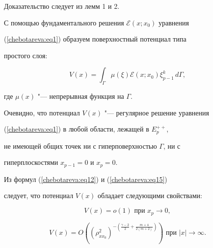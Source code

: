 Доказательство следует из лемм 1 и 2.





С помощью фундаментального решения $\mathcal{E}(x; x_0 )$ уравнения


(\ref{chebotareva:eq1}) образуем поверхностный потенциал типа


простого слоя:





\begin{equation}


\label{chebotareva:eq47} V(x) = \int_{\Gamma}


\mu\left(\xi\right)\mathcal{E}(x; x_0 )\xi _{p-1}^k \,d\Gamma,


\end{equation}


где $\mu (x)$ "--- непрерывная функция на $\Gamma$.





Очевидно,  что потенциал $V(x)$ "--- регулярное решение уравнения


(\ref{chebotareva:eq1}) в любой области,  лежащей в $E_p^{ + + } $, 


не имеющей общих точек ни с гиперповерхностью $\Gamma$,  ни с


гиперплоскостями $x_{p - 1} = 0$ и $x_p = 0$.





Из формул (\ref{chebotareva:eq12}) и (\ref{chebotareva:eq15})


следует,  что потенциал $V(x)$ обладает следующими свойствами:


\begin{equation}


\label{chebotareva:eq48} V(x) = o(1) \text{ при } x_p \to 0,


\end{equation}


\begin{equation}


\label{chebotareva:eq49} V(x) = O\left( {\left( {\rho _{xx_0 }^2 }


\right)^{ - \left( {\frac{\gamma - 2}{2} + \frac{m + 4}{2(m + 2)}}


\right)}} \right)\text{ при } \left| x \right| \to \infty .


\end{equation}



